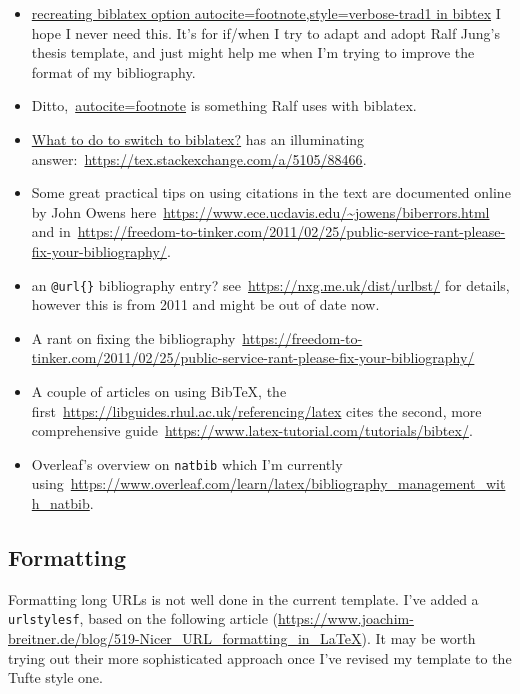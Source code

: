 \begin{itemize}
    \item \href{https://tex.stackexchange.com/questions/14155/recreating-biblatex-option-autocite-footnote-style-verbose-trad1-in-bibtex}{recreating biblatex option autocite=footnote,style=verbose-trad1 in bibtex} I hope I never need this. It's for if/when I try to adapt and adopt Ralf Jung's thesis template, and just might help me when I'm trying to improve the format of my bibliography.
    \item Ditto,~\href{https://tex.stackexchange.com/questions/58576/autocite-footnote}{autocite=footnote} is something Ralf uses with biblatex.
    \item \href{https://tex.stackexchange.com/questions/5091/what-to-do-to-switch-to-biblatex}{What to do to switch to biblatex?} has an illuminating answer:~\url{https://tex.stackexchange.com/a/5105/88466}.
    \item Some great practical tips on using citations in the text are documented online by John Owens here~\url{https://www.ece.ucdavis.edu/~jowens/biberrors.html} and in~\url{https://freedom-to-tinker.com/2011/02/25/public-service-rant-please-fix-your-bibliography/}.
    \item an \texttt{@url\{\}} bibliography entry? see~\url{https://nxg.me.uk/dist/urlbst/} for details, however this is from 2011 and might be out of date now.
    \item A rant on fixing the bibliography~\url{https://freedom-to-tinker.com/2011/02/25/public-service-rant-please-fix-your-bibliography/}
    \item A couple of articles on using BibTeX, the first~\url{https://libguides.rhul.ac.uk/referencing/latex} cites the second, more comprehensive guide~\url{https://www.latex-tutorial.com/tutorials/bibtex/}.
    \item Overleaf's overview on \texttt{natbib} which I'm currently using~\url{https://www.overleaf.com/learn/latex/bibliography_management_with_natbib}.
\end{itemize}

\subsection{Formatting}
Formatting long URLs is not well done in the current template. I've added a \texttt{\\urlstyle{sf}}, based on the following article (\url{https://www.joachim-breitner.de/blog/519-Nicer_URL_formatting_in_LaTeX}). It may be worth trying out their more sophisticated approach once I've revised my template to the Tufte style one. 

